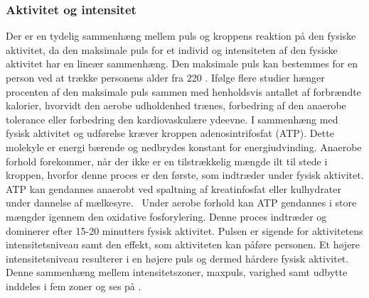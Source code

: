 \subsubsection{Aktivitet og intensitet}\label{subsub:ak_int}
Der er en tydelig sammenhæng mellem puls og kroppens reaktion på den fysiske aktivitet, da den maksimale puls for et individ og intensiteten af den fysiske aktivitet har en lineær sammenhæng. Den maksimale puls kan bestemmes for en person ved at trække personens alder fra 220 \citep{CooperBlair2005}.\newline
Ifølge flere studier hænger procenten af den maksimale puls sammen med henholdsvis antallet af forbrændte kalorier, hvorvidt den aerobe udholdenhed trænes, forbedring af den anaerobe tolerance eller forbedring den kardiovaskulære ydeevne. I sammenhæng med fysisk aktivitet og udførelse kræver kroppen adenosintrifosfat (ATP). Dette molekyle er energi bærende og nedbrydes konstant for energiudvinding. Anaerobe forhold forekommer, når der ikke er en tilstrækkelig mængde ilt til stede i kroppen, hvorfor denne proces er den første, som indtræder under fysisk aktivitet. ATP kan gendannes anaerobt ved spaltning af kreatinfosfat eller kulhydrater under dannelse af mælkesyre.~\citep{Academic2016c,Martini2012,Engelbreth2010} Under aerobe forhold kan ATP gendannes i store mængder igennem den oxidative fosforylering. Denne proces indtræder og dominerer efter 15-20 minutters fysisk aktivitet. 
\citep{Martini2012,Engelbreth2010} \newline
Pulsen er sigende for aktivitetens intensitetsniveau samt den effekt, som aktiviteten kan påføre personen. Et højere intensitetsniveau resulterer i en højere puls og dermed hårdere fysisk aktivitet. Denne sammenhæng mellem intensitetszoner, maxpuls, varighed samt udbytte inddeles i fem zoner og ses på . \citep{Leyland2007,Heartratejournal2015}
